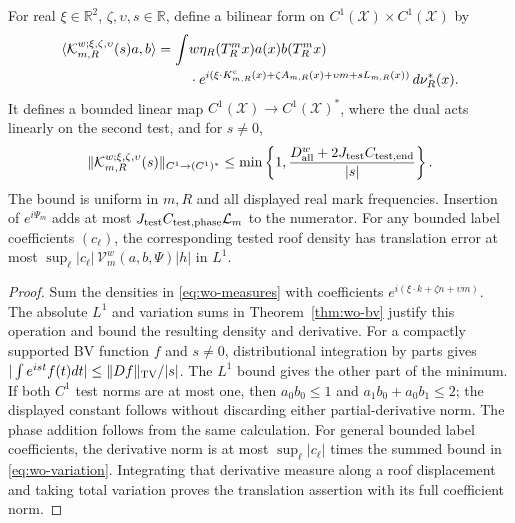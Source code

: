 \begin{corollary}
\label{cor:wo-fourier}
For real $\xi\in\mathbb R^2$, $\zeta,\upsilon,s\in\mathbb R$,
define a bilinear form on $C^1(\mathcal X)\times C^1(\mathcal X)$ by
\begin{equation}\label{eq:wo-operator}
 \begin{split}
 \langle\mathcal K_{m,R}^{w;\xi,\zeta,\upsilon}(s)a,b\rangle
 =\int &w\eta_R(T_R^mx)a(x)b(T_R^mx)\\
 &\cdot e^{i(\xi\cdot K^{\rm c}_{m,R}(x)+
       \zeta A_{m,R}(x)+\upsilon m+sL_{m,R}(x))}
          \,d\nu_R^*(x).
 \end{split}
\end{equation}
It defines a bounded linear map $C^1(\mathcal X)\to C^1(\mathcal X)^*$,
where the dual acts linearly on the second test, and for $s\ne0$,
\begin{equation}\label{eq:wo-weak-bound}
 \|\mathcal K_{m,R}^{w;\xi,\zeta,\upsilon}(s)\|_{C^1\to(C^1)^*}
 \le\min\left\{1,
       \frac{D_{\rm all}^w+2J_{\rm test}C_{\rm test,end}}{|s|}\right\}.
\end{equation}
The bound is uniform in $m,R$ and all displayed real mark
frequencies.  Insertion of $e^{i\Psi_m}$ adds at most
$J_{\rm test}C_{\rm test,phase}\mathcal L_m$ to the numerator.
For any bounded label coefficients $(c_\ell)$, the corresponding tested
roof density has translation error at most
$\sup_\ell|c_\ell|\,\mathcal V_m^w(a,b,\Psi)|h|$ in $L^1$.
\end{corollary}
\begin{proof}
Sum the densities in \eqref{eq:wo-measures} with coefficients
$e^{i(\xi\cdot k+\zeta n+\upsilon m)}$.  The absolute $L^1$
and variation sums in Theorem~\ref{thm:wo-bv} justify this
operation and bound the resulting density and derivative.
For a compactly supported BV function $f$ and $s\ne0$,
distributional integration by parts gives
$|\int e^{ist}f(t)dt|\le\|Df\|_{\rm TV}/|s|$.
The $L^1$ bound gives the other part of the minimum.
If both $C^1$ test norms are at most one, then
$a_0b_0\le1$ and $a_1b_0+a_0b_1\le2$; the displayed
constant follows without discarding either partial-derivative
norm.  The phase addition follows from the same calculation.
For general bounded label coefficients, the derivative norm is
at most $\sup_\ell|c_\ell|$ times the summed bound in
\eqref{eq:wo-variation}. Integrating that derivative measure along
a roof displacement and taking total variation proves the
translation assertion with its full coefficient norm.
\end{proof}

